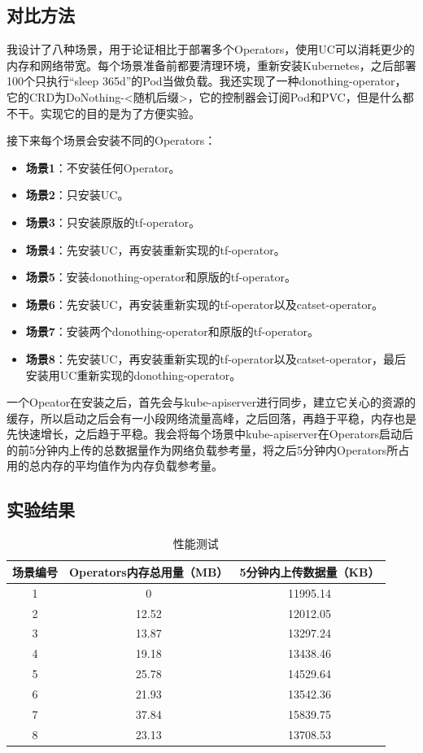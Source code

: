 \documentclass[macfonts,master]{njuthesis}
\begin{document}
\subsection{对比方法}

我设计了八种场景，用于论证相比于部署多个Operators，使用UC可以消耗更少的内存和网络带宽。每个场景准备前都要清理环境，重新安装Kubernetes，之后部署100个只执行``sleep 365d''的Pod当做负载。我还实现了一种donothing-operator，它的CRD为DoNothing-<随机后缀>，它的控制器会订阅Pod和PVC，但是什么都不干。实现它的目的是为了方便实验。

接下来每个场景会安装不同的Operators：
\begin{itemize}
	\item \textbf{场景1}：不安装任何Operator。
	\item \textbf{场景2}：只安装UC。
	\item \textbf{场景3}：只安装原版的tf-operator。
	\item \textbf{场景4}：先安装UC，再安装重新实现的tf-operator。
	\item \textbf{场景5}：安装donothing-operator和原版的tf-operator。
	\item \textbf{场景6}：先安装UC，再安装重新实现的tf-operator以及catset-operator。
	\item \textbf{场景7}：安装两个donothing-operator和原版的tf-operator。
	\item \textbf{场景8}：先安装UC，再安装重新实现的tf-operator以及catset-operator，最后安装用UC重新实现的donothing-operator。
\end{itemize}

一个Opeator在安装之后，首先会与kube-apiserver进行同步，建立它关心的资源的缓存，所以启动之后会有一小段网络流量高峰，之后回落，再趋于平稳，内存也是先快速增长，之后趋于平稳。我会将每个场景中kube-apiserver在Operators启动后的前5分钟内上传的总数据量作为网络负载参考量，将之后5分钟内Operators所占用的总内存的平均值作为内存负载参考量。

\subsection{实验结果}

\begin{table}
  \centering
  \begin{tabular}{ccc}
    \toprule
    \textbf{场景编号} & \textbf{Operators内存总用量（MB）} & \textbf{5分钟内上传数据量（KB）} \\
    \midrule
    1  & 0 & 11995.14 \\
    2  & 12.52  &  12012.05 \\
    3  & 13.87  & 13297.24 \\
    4  & 19.18 &  13438.46 \\
    5  & 25.78  & 14529.64 \\
    6  & 21.93  & 13542.36 \\
    7  & 37.84  & 15839.75 \\
    8  & 23.13  & 13708.53 \\
    \bottomrule
  \end{tabular}
  \caption{性能测试}\label{table:test}
\end{table}
\end{document}

